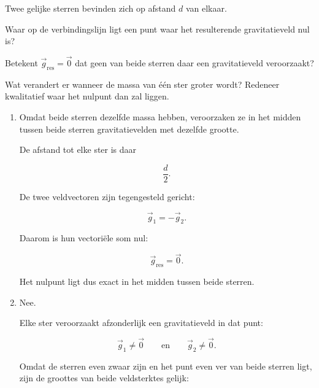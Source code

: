 \documentclass{ximera}
\begin{document}
\begin{oefening}[Nulveld]{\oefU\ESS}

Twee gelijke sterren bevinden zich op afstand $d$ van elkaar.

\begin{question}
Waar op de verbindingslijn ligt een punt waar het resulterende
gravitatieveld nul is?
\end{question}

\begin{question}
Betekent $\vec g_\mathrm{res}=\vec0$ dat geen van beide sterren daar
een gravitatieveld veroorzaakt?
\end{question}

\begin{question}
Wat verandert er wanneer de massa van één ster groter wordt?
Redeneer kwalitatief waar het nulpunt dan zal liggen.
\end{question}

\begin{oplossing}

      \begin{enumerate}
      
      \item
      Omdat beide sterren dezelfde massa hebben, veroorzaken ze in het
      midden tussen beide sterren gravitatievelden met dezelfde grootte.
      
      De afstand tot elke ster is daar
      
      \[
      \frac d2.
      \]
      
      De twee veldvectoren zijn tegengesteld gericht:
      
      \[
      \vec g_1=-\vec g_2.
      \]
      
      Daarom is hun vectoriële som nul:
      
      \[
      \boxed{
      \vec g_{\mathrm{res}}=\vec 0.
      }
      \]
      
      Het nulpunt ligt dus exact in het midden tussen beide sterren.
      
      
      \item
      Nee.
      
      Elke ster veroorzaakt afzonderlijk een gravitatieveld in dat punt:
      
      \[
      \vec g_1\neq\vec 0
      \qquad\text{en}\qquad
      \vec g_2\neq\vec 0.
      \]
      
      Omdat de sterren even zwaar zijn en het punt even ver van beide
      sterren ligt, zijn de groottes van beide veldsterktes gelijk:
      

\end{enumerate}
\end{oplossing}
\end{oefening}
\end{document}
